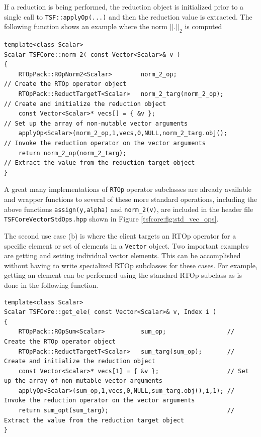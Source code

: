 \documentclass[10pt,fleqn]{article}
\begin{document}
If a reduction is being performed, the reduction object is initialized
prior to a single call to \texttt{TSF::applyOp(...)} and then the
reduction value is extracted.  The following function shows an example
where the norm $||.||_2$ is computed

{\scriptsize\begin{verbatim}
template<class Scalar>
Scalar TSFCore::norm_2( const Vector<Scalar>& v )
{
    RTOpPack::ROpNorm2<Scalar>        norm_2_op;                     // Create the RTOp operator object
    RTOpPack::ReductTargetT<Scalar>   norm_2_targ(norm_2_op);        // Create and initialize the reduction object
    const Vector<Scalar>* vecs[] = { &v };                           // Set up the array of non-mutable vector arguments
    applyOp<Scalar>(norm_2_op,1,vecs,0,NULL,norm_2_targ.obj();       // Invoke the reduction operator on the vector arguments
    return norm_2_op(norm_2_targ);                                   // Extract the value from the reduction target object
}
\end{verbatim}}

A great many implementations of \texttt{RTOp} operator subclasses are
already available and wrapper functions to several of these more
standard operations, including the above functions
\texttt{assign(y,alpha)} and \texttt{norm\_2(v)},
are included in the header file \texttt{TSFCoreVectorStdOps.hpp} shown in
Figure \ref{tsfcore:fig:std_vec_ops}.

The second use case (b) is where the client targets an RTOp operator
for a specific element or set of elements in a \texttt{Vector} object.
Two important examples are getting and setting individual vector
elements.  This can be accomplished without having to write specialized
RTOp subclasses for these cases.  For example, getting an element
can be performed using the standard RTOp subclass as is done
in the following function.

{\scriptsize\begin{verbatim}
template<class Scalar>
Scalar TSFCore::get_ele( const Vector<Scalar>& v, Index i )
{
    RTOpPack::ROpSum<Scalar>          sum_op;                 // Create the RTOp operator object
    RTOpPack::ReductTargetT<Scalar>   sum_targ(sum_op);       // Create and initialize the reduction object
    const Vector<Scalar>* vecs[1] = { &v };                   // Set up the array of non-mutable vector arguments
    applyOp<Scalar>(sum_op,1,vecs,0,NULL,sum_targ.obj(),i,1); // Invoke the reduction operator on the vector arguments
    return sum_opt(sum_targ);                                 // Extract the value from the reduction target object
}
\end{verbatim}}
\end{document}

